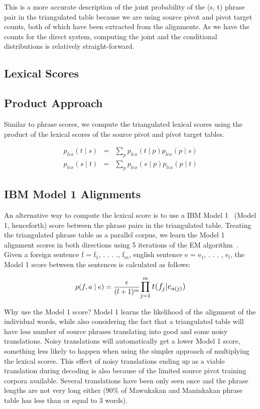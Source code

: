 \documentclass[11pt]{article}
\begin{document}
	This is a more accurate description of the joint probability of the (s, t) phrase pair in the triangulated table because we are using source pivot and pivot target counts, both of which have been extracted from the alignments. As we have the counts for the direct system, computing the joint and the conditional distributions is relatively straight-forward. 

\subsection{Lexical Scores}
\label{sec:lexical_scores}
\subsection{Product Approach}
	Similar to phrase scores, we compute the triangulated lexical scores using the product of the lexical scores of the source pivot and pivot target tables.   

	\begin{eqnarray}
        p_{lex}(t \mid s) &=& \sum_{p} p_{lex}(t \mid p) p_{lex}(p \mid s) \\
        p_{lex}(s \mid t) &=& \sum_{p} p_{lex}(s \mid p) p_{lex}(p \mid t)
	\end{eqnarray}

\subsection{IBM Model 1 Alignments}
\label{sec:model1}

	An alternative way to compute the lexical score is to use a IBM Model 1~\cite{Brown:1993} (Model 1, henceforth) score between the phrase pairs in the triangulated table. Treating the triangulated phrase table as a parallel corpus, we learn the Model 1 alignment scores in both directions using 5 iterations of the EM algorithm~\cite{Dempster:77}. Given a foreign sentence f = f$_{1}$, . . . ., f$_{m}$, english sentence e = e$_{1}$, . . . , e$_{l}$, the Model 1 score between the sentences is calculated as follows: 

		\begin{equation}
			p(f, a \mid e) = \frac{\epsilon}{(l+1)^m}\mathlarger{\prod\limits_{j=1}^{m}t(f_{j}|e_{a(j)})}
		\end{equation}

	Why use the Model 1 score? Model 1 learns the likelihood of the alignment of the individual words, while also considering the fact that a triangulated table will have less number of source phrases translating into good and some noisy translations. Noisy translations will automatically get a lower Model 1 score, something less likely to happen when using the simpler approach of multiplying the lexical scores. This effect of noisy translations ending up as a viable translation during decoding is also because of the limited source pivot training corpora available. Several translations have been only seen once and the phrase lengths are not very long either (90\% of Mawukakan and Maninkakan phrase table has less than or equal to 3 words).
\end{document}

